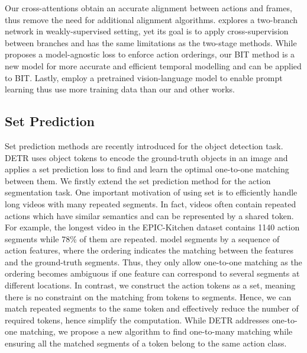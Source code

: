 \documentclass[10pt,twocolumn,letterpaper]{article}
\newcommand{\0}{\boldsymbol{0}}
\begin{document}
Our cross-attentions obtain an accurate alignment between actions and frames, thus remove the need for additional alignment algorithms. 
\cite{Souri:PAMI21} explores a two-branch network in weakly-supervised setting, yet its goal is to apply cross-supervision between branches and has the same limitations as the two-stage methods.
While \cite{Xu:NIPS22} proposes a model-agnostic loss to enforce action orderings, our BIT method is a new model for more accurate and efficient temporal modelling and \cite{Xu:NIPS22} can be applied to BIT.
Lastly, \cite{Zhang:Arxiv22,Li:CVPR22} employ a pretrained vision-language model \cite{Wang:CoRR21} to enable prompt learning thus use more training data than our and other works.






\vspace{-2mm}
\subsection{Set Prediction}
\vspace{-2mm}
Set prediction methods \cite{Carion:CoRR20,Zhu:Arxiv20,Meng:ICCV21,Meinhardt:CVPR22, Dai:ICCV21} are recently introduced for the object detection task. 
DETR \cite{Carion:CoRR20} uses object tokens to encode the ground-truth objects in an image and applies a set prediction loss to find and learn the optimal one-to-one matching between them.
We firstly extend the set prediction method for the action segmentation task. 
One important motivation of using set is to efficiently handle long videos with many repeated segments. 
In fact, videos often contain repeated actions which have similar semantics and can be represented by a shared token.
For example, the longest video in the EPIC-Kitchen dataset \cite{Damen:IJCV22} contains 1140 action segments while 78\% of them are repeated.
\cite{Ahn:ICCV21,Behrmann:ECCV22} model segments by a sequence of action features, where the ordering indicates the matching between the features and the ground-truth segments. Thus, they only allow one-to-one matching as the ordering becomes ambiguous if one feature can correspond to several segments at different locations. 
In contrast, we construct the action tokens as a set, meaning there is no constraint on the matching from tokens to segments. Hence, we can match repeated segments to the same token and effectively reduce the number of required tokens, hence simplify the computation. 
While DETR \cite{Carion:CoRR20} addresses one-to-one matching, we propose a new algorithm to find one-to-many matching while ensuring all the matched segments of a token belong to the same action class.
\end{document}
